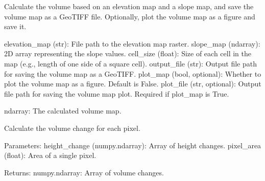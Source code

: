 \documentclass[letterpaper,10pt,english]{sphinxmanual}
\begin{document}
\begin{fulllineitems}
\label{\detokenize{akhdefo_functions:akhdefo_functions.Akhdefo_Tools.calculate_volume}}
\pysigstartsignatures
{}
\pysigstopsignatures
\sphinxAtStartPar
Calculate the volume based on an elevation map and a slope map,
and save the volume map as a GeoTIFF file. Optionally, plot the volume map as a figure and save it.
\begin{description}
\sphinxAtStartPar
elevation\_map (str): File path to the elevation map raster.
slope\_map (ndarray): 2D array representing the slope values.
cell\_size (float): Size of each cell in the map (e.g., length of one side of a square cell).
output\_file (str): Output file path for saving the volume map as a GeoTIFF.
plot\_map (bool, optional): Whether to plot the volume map as a figure. Default is False.
plot\_file (str, optional): Output file path for saving the volume map plot. Required if plot\_map is True.

\sphinxAtStartPar
ndarray: The calculated volume map.

\end{description}

\end{fulllineitems}


\begin{fulllineitems}
\label{\detokenize{akhdefo_functions:akhdefo_functions.Akhdefo_Tools.calculate_volume_change}}
\pysigstartsignatures
{}
\pysigstopsignatures
\sphinxAtStartPar
Calculate the volume change for each pixel.

\sphinxAtStartPar
Parameters:
height\_change (numpy.ndarray): Array of height changes.
pixel\_area (float): Area of a single pixel.

\sphinxAtStartPar
Returns:
numpy.ndarray: Array of volume changes.

\end{fulllineitems}
\end{document}
